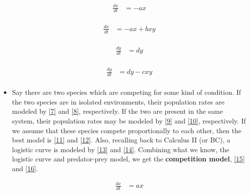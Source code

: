 \documentclass[12pt]{article}
\begin{document}
\begin{itemize}
    \begin{equation}
      \begin{split}
        \frac{dx}{dt} & = -ax \\
      \end{split}
      \label{4}
    \end{equation}

    \begin{equation}
      \begin{split}
        \frac{dx}{dt} & = -ax+bxy \\
      \end{split}
      \label{5}
    \end{equation}

    \begin{equation}
      \begin{split}
        \frac{dy}{dt} & = dy \\
      \end{split}
      \label{6}
    \end{equation}

    \begin{equation}
      \begin{split}
        \frac{dy}{dt} & = dy-cxy \\
      \end{split}
      \label{6}
    \end{equation}

  \item Say there are two species which are competing for some kind of condition. If the two species are in isolated environments, their population rates are modeled by \eqref{7} and \eqref{8}, respectively. If the two are present in the same system, their population rates may be modeled by \eqref{9} and \eqref{10}, respectively. If we assume that these species compete proportionally to each other, then the best model is \eqref{11} and \eqref{12}. Also, recalling back to Calculus II (or BC), a logistic curve is modeled by \eqref{13} and \eqref{14}. Combining what we know, the logistic curve and predator-prey model, we get the \textbf{competition model}, \eqref{15} and \eqref{16}.

    \begin{equation}
      \begin{split}
        \frac{dx}{dt} & = ax \\
      \end{split}
      \label{7}
    \end{equation}


\end{itemize}
\end{document}
